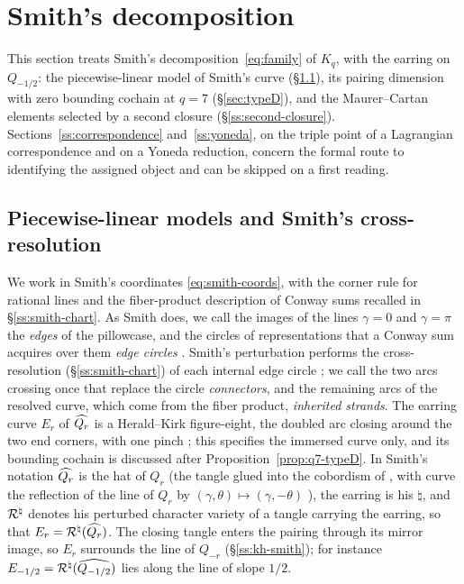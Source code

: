 \section{Smith's decomposition}\label{sec:smith}

This section treats Smith's decomposition~\eqref{eq:family} of $K_q$, with the earring on $Q_{-1/2}$: the
piecewise-linear model of Smith's curve (\S\ref{ss:models}), its pairing dimension with zero bounding cochain at
$q=7$ (\S\ref{sec:typeD}), and the Maurer--Cartan elements selected by a second closure
(\S\ref{ss:second-closure}).  Sections~\ref{ss:correspondence} and~\ref{ss:yoneda}, on the triple point of
a Lagrangian correspondence and on a Yoneda reduction, concern the formal route to identifying the assigned
object and can be skipped on a first reading.

\subsection{Piecewise-linear models and Smith's cross-resolution}\label{ss:models}
We work in Smith's coordinates \eqref{eq:smith-coords}, with the corner rule for rational lines and
the fiber-product description of Conway sums recalled in \S\ref{ss:smith-chart}.  As Smith does, we
call the images of the lines $\gamma=0$ and $\gamma=\pi$ the \emph{edges} of the pillowcase, and the
circles of representations that a Conway sum acquires over them \emph{edge circles}
\cite[Thms.~3.15 and 3.26]{Smith}.  Smith's perturbation performs the cross-resolution
(\S\ref{ss:smith-chart}) of each internal edge circle \cite[Thm.~4.22]{Smith}; we call the two arcs crossing
once that replace the circle \emph{connectors}, and the remaining arcs of the resolved curve, which come from the fiber
product, \emph{inherited strands}.  The earring curve $E_r$ of $\widehat{Q_{r}}$ is a Herald--Kirk
figure-eight, the doubled arc closing around the two end corners, with one pinch \cite[Def.~6.7]{HK}; this
specifies the immersed curve only, and its bounding cochain is discussed after
Proposition~\ref{prop:q7-typeD}.  In Smith's notation $\widehat{Q_{r}}$ is the hat of $Q_r$ (the tangle
glued into the cobordism of \cite[Fig.~11a]{Smith}, with curve the reflection of the line of $Q_r$ by
$(\gamma,\theta)\mapsto(\gamma,-\theta)$ \cite[Lem.~2.31]{Smith}), the earring is his $\natural$, and $\mathcal{R}^{\natural}$
denotes his perturbed character variety of a tangle carrying the earring, so that
$E_r=\mathcal{R}^{\natural}(\widehat{Q_{r}})$.  The closing tangle enters the pairing through its
mirror image, so $E_r$ surrounds the line of $Q_{-r}$ (\S\ref{ss:kh-smith}); for instance
$E_{-1/2}=\mathcal{R}^{\natural}(\widehat{Q_{-1/2}})$ lies along the line of slope $1/2$.

